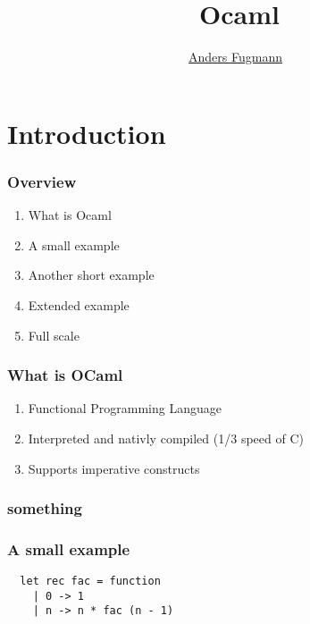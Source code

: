 \documentclass[mathserif,xcolor=svgnames]{beamer}
\renewcommand{\_}{\mathunderscore}
\begin{document}
\title[OCaml]{\
  Ocaml
}
\author[Anders Fugmann]{\
  \normalfont \underline{Anders Fugmann}
}
\date{}

\maketitle

\section{Introduction}

\begin{frame}
  \frametitle{Overview}

  \begin{enumerate}
  \item What is Ocaml
  \item A small example
  \item Another short example
  \item Extended example
  \item Full scale
  \end{enumerate}
\end{frame}

\begin{frame}[fragile]
   \frametitle{What is OCaml}
   \begin{enumerate}
   \item Functional Programming Language
   \item Interpreted and nativly compiled (1/3 speed of C)
   \item Supports imperative constructs
   \end{enumerate}
\end{frame}




\begin{frame}[fragile]
  \frametitle{something}
\end{frame}

\begin{frame}[fragile]
  \frametitle{A small example}
  \begin{lstlisting}
  let rec fac = function
    | 0 -> 1
    | n -> n * fac (n - 1)
  \end{lstlisting}
\end{frame}
\end{document}
